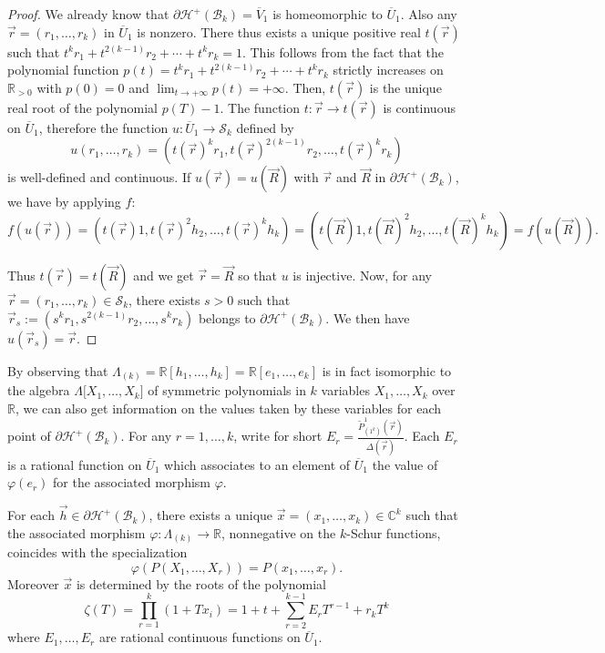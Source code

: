 \documentclass[ALCO,ThmDefs,Unicode,epreuves]{cedram}
\begin{document}
\begin{proof}
We already know that $\partial\mathcal{H}^{+}(\mathcal{B}_{k})=\overline
{V}_{1}$ is homeomorphic to $\overline{U}_{1}$. Also any $\vec{r}%
=(r_{1},\ldots,r_{k})$ in $\overline{U}_{1}$ is nonzero. There thus exists a
unique positive real $t(\vec{r})$ such that $t^{k}r_{1}+t^{2(k-1)}r_{2}%
+\cdots+t^{k}r_{k}=1$. This follows from the fact that the polynomial
function $p(t)=t^{k}r_{1}+t^{2(k-1)}r_{2}+\cdots+t^{k}r_{k}$ strictly
increases on $\mathbb{R}_{>0}$ with $p(0)=0$ and $\lim_{t\rightarrow
+\infty} p(t)=+\infty$. Then, $t(\vec{r})$ is the unique real root of the
polynomial $p(T)-1$. The function $t:\vec{r}\rightarrow t(\vec{r})$ is
continuous on $\overline{U}_{1}$, therefore the function $u:\overline{U}%
_{1}\rightarrow\mathcal{S}_{k}$ defined by%
\[
u(r_{1},\ldots,r_{k})=(t(\vec{r})^{k}r_{1},t(\vec{r})^{2(k-1)}r_{2}%
,\ldots,t(\vec{r})^{k}r_{k})
\]
is well-defined and continuous. If $u(\vec{r})=u(\vec{R})$ with $\vec{r}$ and
$\vec{R}$ in $\partial\mathcal{H}^{+}(\mathcal{B}_{k})$, we have by applying
$f:$%
\[
f(u(\vec{r}))=(t(\vec{r})1,t(\vec{r})^{2}h_{2},\ldots,t(\vec{r})^{k}%
h_{k})=(t(\vec{R})1,t(\vec{R})^{2}h_{2},\ldots,t(\vec{R})^{k}h_{k}%
)=f(u(\vec{R})).
\]


Thus $t(\vec{r})=t(\vec{R})$ and we get $\vec{r}=\vec{R}$ so that $u$ is
injective. Now, for any $\vec{r}=(r_{1},\ldots,r_{k})\in\mathcal{S}_{k}$,
there exists $s>0$ such that $\vec{r}_{s}:=(s^{k}r_{1}%
,s^{2(k-1)}r_{2},\ldots,s^{k}r_{k})$ belongs to $\partial\mathcal{H}%
^{+}(\mathcal{B}_{k})$. We then have $u(\vec{r}_{s})=\vec{r}$.
\end{proof}

By observing that $\Lambda_{(k)}=\mathbb{R}[h_{1},\ldots,h_{k}]=\mathbb{R}%
[e_{1},\ldots,e_{k}]$ is in fact isomorphic to the algebra $\Lambda\lbrack
X_{1},\ldots,X_{k}]$ of symmetric polynomials in $k$ variables $X_{1}%
,\ldots,X_{k}$ over $\mathbb{R}$, we can also get information on the values
taken by these variables for each point of $\partial\mathcal{H}^{+}%
(\mathcal{B}_{k}).$ For any $r=1,\ldots,k$, write for short $E_{r}%
=\frac{\widetilde{P}_{(1^{k})}^{1}(\vec{r})}{\Delta(\vec{r})}$. Each $E_{r}$
is a rational function on $\overline{U}_{1}$ which associates to an element of
$\overline{U}_{1}$ the value of $\varphi(e_{r})$ for the associated morphism
$\varphi$.

\begin{prop}
For each $\vec{h}\in\partial\mathcal{H}^{+}(\mathcal{B}_{k})$, there exists a
unique $\vec{x}=(x_{1},\ldots,x_{k})\in\mathbb{C}^{k}$ such that the
associated morphism $\varphi:\Lambda_{(k)}\rightarrow\mathbb{R}$, nonnegative
on the $k$-Schur functions, coincides with the specialization%
\[
\varphi(P(X_{1},\ldots,X_{r}))=P(x_{1},\ldots,x_{r}).
\]
Moreover $\vec{x}$ is determined by the roots of the polynomial%
\[
\zeta(T)=\prod_{r=1}^{k}(1+Tx_{i})=1+t+\sum_{r=2}^{k-1}E_{r}T^{r-1}+r_{k}T^{k}%
\]
where $E_{1},\ldots,E_{r}$ are rational continuous functions on $\overline
{U}_{1}$.
\end{prop}
\end{document}
